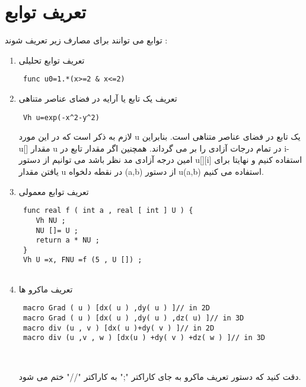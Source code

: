 \section{تعریف توابع}
توابع می توانند برای مصارف زیر تعریف شوند :

\begin{enumerate}
	\item تعریف توابع تحلیلی
		 \begin{LTR}
			 \begin{lstlisting}
 func u0=1.*(x>=2 & x<=2)  
		   \end{lstlisting}
		 \end{LTR}
	\item تعریف یک تابع یا آرایه در فضای عناصر متناهی
		\begin{LTR}
			\begin{lstlisting}
 Vh u=exp(-x^2-y^2)  
			\end{lstlisting}
		\end{LTR}
		لازم به ذکر است که در این مورد u یک تابع در فضای عناصر متناهی است. بنابراین u[] مقدار u در تمام درجات آزادی را بر می گرداند. همچنین اگر مقدار تابع در i-امین درجه آزادی مد نظر باشد می توانیم از دستور u[][i] استفاده کنیم و نهایتا برای یافتن مقدار u در نقطه دلخواه (a,b) از دستور u(a,b) استفاده می کنیم.
	\item تعریف توابع معمولی
	\begin{LTR}
		\begin{lstlisting}
 func real f ( int a , real [ int ] U ) {
 	Vh NU ;
 	NU []= U ;
 	return a * NU ;
 }
 Vh U =x, FNU =f (5 , U []) ;
  
		\end{lstlisting}
	\end{LTR}
	\item تعریف ماکرو ها
	\begin{LTR}
	\begin{lstlisting}
 macro Grad ( u ) [dx( u ) ,dy( u ) ]// in 2D
 macro Grad ( u ) [dx( u ) ,dy( u ) ,dz( u) ]// in 3D
 macro div (u , v ) [dx( u )+dy( v ) ]// in 2D
 macro div (u ,v , w ) [dx(u ) +dy( v ) +dz( w ) ]// in 3D

  
		\end{lstlisting}
	\end{LTR}
دقت کنید که دستور تعریف ماکرو به جای کاراکتر ";" به کاراکتر "//" ختم می شود.	
\end{enumerate}

